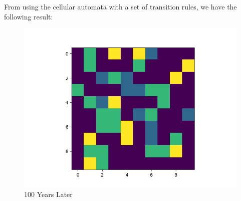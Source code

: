 \documentclass[a4paper,12pt]{report}
\begin{document}
From using the cellular automata with a set of transition rules, we have the following result:

\begin{figure}[h]
\centering
\includegraphics[scale=0.6]{../output/Land3/Land3-Gen-10.png}
\caption{100 Years Later}
\end{figure}
\end{document}
